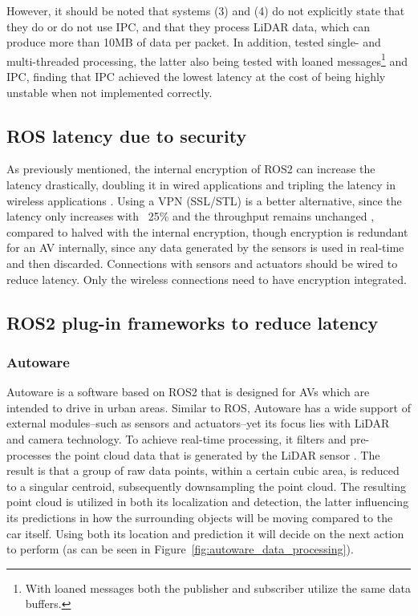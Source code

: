 \documentclass[conference,a4paper]{IEEEtran}
\begin{document}
\setlength{\parskip}{1em}
\setlength{\parindent}{10pt}
However, it should be noted that systems (3) and (4) do not explicitly state that they do or do not use IPC, and that they process LiDAR data, which can produce more than 10MB of data per packet.
In addition, \cite{Macenski2023} tested single- and \mbox{multi-threaded} processing, the latter also being tested with loaned messages\footnote{With loaned messages both the publisher and subscriber utilize the same data buffers.} and IPC, finding that IPC achieved the lowest latency at the cost of being highly unstable when not implemented correctly. 

\setlength{\parskip}{0.5em}
\setlength{\parindent}{0pt}
\subsection{ROS latency due to security}

\setlength{\parskip}{0em}
\setlength{\parindent}{10pt}
As previously mentioned, the internal encryption of ROS2 can increase the latency drastically, doubling it in wired applications and tripling the latency in wireless applications \cite{Kim2018}.
Using a VPN (SSL/STL) is a better alternative, since the latency only increases with ~25\% and the throughput remains unchanged \cite{Kim2018}, compared to halved with the internal encryption, 
though encryption is redundant for an AV internally, since any data generated by the sensors is used in \mbox{real-time} and then discarded.
Connections with sensors and actuators should be wired to reduce latency.
Only the wireless connections need to have encryption integrated.

\setlength{\parskip}{0.5em}
\setlength{\parindent}{0pt}
\subsection{ROS2 \mbox{plug-in} frameworks to reduce latency}

\subsubsection{Autoware}
Autoware is a software based on ROS2 that is designed for AVs which are intended to drive in urban areas.
Similar to ROS, Autoware has a wide support of external modules--such as sensors and actuators--yet its focus lies with LiDAR and camera technology.
To achieve \mbox{real-time} processing, it filters and \mbox{pre-processes} the point cloud data that is generated by the LiDAR sensor \cite{Kato2018}.
The result is that a group of raw data points, within a certain cubic area, is reduced to a singular centroid, subsequently downsampling the point cloud.
The resulting point cloud is utilized in both its localization and detection, the latter influencing its predictions in how the surrounding objects will be moving compared to the car itself.
Using both its location and prediction it will decide on the next action to perform (as can be seen in Figure~\ref{fig:autoware_data_processing}).
\end{document}
